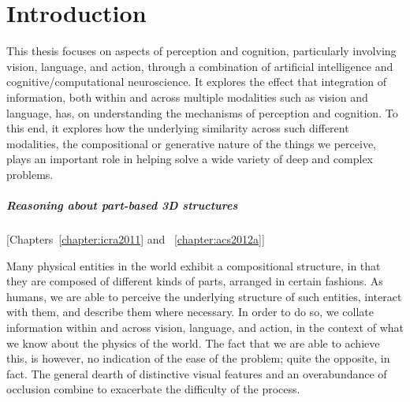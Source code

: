 \chapter{Introduction}

This thesis focuses on aspects of perception and cognition, particularly
involving vision, language, and action, through a combination of artificial
intelligence and cognitive/computational neuroscience.
%
It explores the effect that integration of information, both within and across
multiple modalities such as vision and language, has, on understanding the
mechanisms of perception and cognition.
%
To this end, it explores how the underlying similarity across such different
modalities, the compositional or generative nature of the things we perceive,
plays an important role in helping solve a wide variety of deep and complex
problems.

\paragraph{Reasoning about part-based 3D
  structures}[Chapters~\ref{chapter:icra2011} and ~\ref{chapter:acs2012a}]

Many physical entities in the world exhibit a compositional structure, in
that they are composed of different kinds of parts, arranged in certain
fashions.
%
As humans, we are able to perceive the underlying structure of such entities,
interact with them, and describe them where necessary.
%
In order to do so, we collate information within and across vision, language,
and action, in the context of what we know about the physics of the world.
%
The fact that we are able to achieve this, is however, no indication of the
ease of the problem; quite the opposite, in fact.
%
The general dearth of distinctive visual features and an overabundance of
occlusion combine to exacerbate the difficulty of the process.

